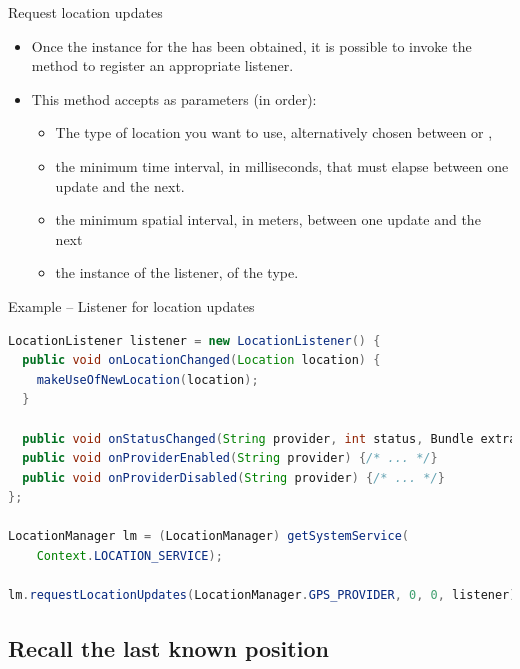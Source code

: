 \documentclass{beamer}
\begin{document}
  \begin{frame}{Request location updates}
    \begin{itemize}\itemsep10pt
      \item Once the instance for the  has been obtained,
      it is possible to invoke the  method to
      register an appropriate listener.
      \item This method accepts as parameters (in order):
      \begin{itemize}
        \item The type of location you want to use, alternatively chosen between
         or
        , 
        \item the minimum time interval, in milliseconds, that must elapse
        between one update and the next.
        \item the minimum spatial interval, in meters, between one update and the next
        \item the instance of the listener, of the  type.
      \end{itemize}
    \end{itemize}

    \begin{exampleblock}{Example -- Listener for location updates}
      \begin{lstlisting}[language=Java] 
LocationListener listener = new LocationListener() {
  public void onLocationChanged(Location location) {
    makeUseOfNewLocation(location);
  }

  public void onStatusChanged(String provider, int status, Bundle extras) {/* ... */}
  public void onProviderEnabled(String provider) {/* ... */}
  public void onProviderDisabled(String provider) {/* ... */}
};

LocationManager lm = (LocationManager) getSystemService(
    Context.LOCATION_SERVICE);
                                        
lm.requestLocationUpdates(LocationManager.GPS_PROVIDER, 0, 0, listener);                                        
      \end{lstlisting}
    \end{exampleblock}
  \end{frame}

\subsection*{Recall the last known position}
\end{document}
